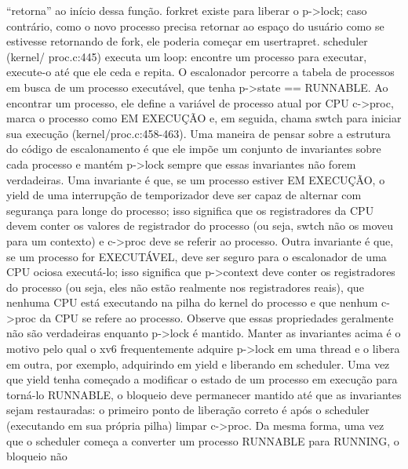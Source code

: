  “retorna”  ao  início  dessa  função.  forkret  existe  para  liberar  o  p->lock;  caso  contrário,  como  o  novo  processo  precisa  retornar  
ao  espaço  do  usuário  como  se  estivesse  retornando  de  fork,  ele  poderia  começar  em  usertrapret.  scheduler  (kernel/
 proc.c:445)  executa  
um  loop:  encontre  um  processo  para  executar,  execute-o  até  que  ele  ceda  e  repita.
 O  escalonador  percorre  a  tabela  de  processos  em  busca  de  um  processo  executável,  que  tenha  p->state  ==  
RUNNABLE.  Ao  encontrar  um  processo,  ele  define  a  variável  de  processo  atual  por  CPU  c->proc,  marca  o  
processo  como  EM  EXECUÇÃO  e,  em  seguida,  chama  swtch  para  iniciar  sua  execução  (kernel/proc.c:458-463).
 Uma  maneira  de  pensar  sobre  a  estrutura  do  código  de  escalonamento  é  que  ele  impõe  um  conjunto  de  invariantes  
sobre  cada  processo  e  mantém  p->lock  sempre  que  essas  invariantes  não  forem  verdadeiras.  Uma  invariante  é  que,  se  um  
processo  estiver  EM  EXECUÇÃO,  o  yield  de  uma  interrupção  de  temporizador  deve  ser  capaz  de  alternar  com  segurança  
para  longe  do  processo;  isso  significa  que  os  registradores  da  CPU  devem  conter  os  valores  de  registrador  do  processo  (ou  
seja,  swtch  não  os  moveu  para  um  contexto)  e  c->proc  deve  se  referir  ao  processo.  Outra  invariante  é  que,  se  um  processo  
for  EXECUTÁVEL,  deve  ser  seguro  para  o  escalonador  de  uma  CPU  ociosa  executá-lo;  isso  significa  que  p->context  deve  
conter  os  registradores  do  processo  (ou  seja,  eles  não  estão  realmente  nos  registradores  reais),  que  nenhuma  CPU  está  
executando  na  pilha  do  kernel  do  processo  e  que  nenhum  c->proc  da  CPU  se  refere  ao  processo.  Observe  que  essas  
propriedades  geralmente  não  são  verdadeiras  enquanto  p->lock  é  mantido.
 Manter  as  invariantes  acima  é  o  motivo  pelo  qual  o  xv6  frequentemente  adquire  p->lock  em  uma  thread  e  o  libera  em  
outra,  por  exemplo,  adquirindo  em  yield  e  liberando  em  scheduler.  Uma  vez  que  yield  tenha  começado  a  modificar  o  estado  
de  um  processo  em  execução  para  torná-lo  RUNNABLE,  o  bloqueio  deve  permanecer  mantido  até  que  as  invariantes  sejam  
restauradas:  o  primeiro  ponto  de  liberação  correto  é  após  o  scheduler  (executando  em  sua  própria  pilha)  limpar  c->proc.  Da  
mesma  forma,  uma  vez  que  o  scheduler  começa  a  converter  um  processo  RUNNABLE  para  RUNNING,  o  bloqueio  não  
